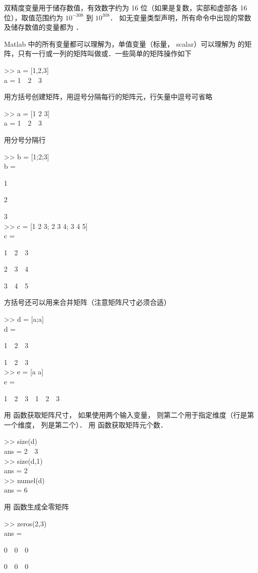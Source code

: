 双精度变量用于储存数值，有效数字约为 16 位（如果是复数，实部和虚部各 16 位），取值范围约为 $10^{-308}$ 到 $10^{308}$． 如无变量类型声明，所有命令中出现的常数及储存数值的变量都为 ．

Matlab 中的所有变量都可以理解为，单值变量（标量， scalar）可以理解为  的矩阵，只有一行或一列的矩阵叫做或．一些简单的矩阵操作如下
\begin{Command}
>> a = [1,2,3] \\
a = 1\ \ 2\ \ 3
\end{Command}
用方括号创建矩阵，用逗号分隔每行的矩阵元，行矢量中逗号可省略
\begin{Command}
>> a = [1 2 3] \\
a = 1\ \ 2\ \ 3
\end{Command}
用分号分隔行
\begin{Command}
>> b = [1;2;3] \\
b = \par
1 \par
2 \par
3 \\
>> c = [1 2 3; 2 3 4; 3 4 5]\\
c = \par
1\ \ 2\ \ 3 \par
2\ \ 3\ \ 4 \par
3\ \ 4\ \ 5
\end{Command}
方括号还可以用来合并矩阵（注意矩阵尺寸必须合适）
\begin{Command}
>> d = [a;a] \\
d = \par
1\ \ 2\ \ 3 \par
1\ \ 2\ \ 3 \\
>> e = [a a] \\
e = \par
1\ \ 2\ \ 3\ \ 1\ \ 2\ \ 3
\end{Command}
用  函数获取矩阵尺寸， 如果使用两个输入变量， 则第二个用于指定维度（行是第一个维度， 列是第二个）． 用  函数获取矩阵元个数．
\begin{Command}
>> size(d) \\
ans = 2\ \ 3 \\
>> size(d,1) \\
ans = 2 \\
>> numel(d) \\
ans = 6
\end{Command}
用  函数生成全零矩阵
\begin{Command}
>> zeros(2,3) \\
ans = \par
0\ \ 0\ \ 0 \par
0\ \ 0\ \ 0
\end{Command}
